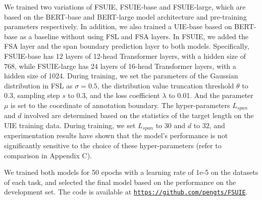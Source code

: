 \documentclass[11pt]{article}
\begin{document}
We trained two variations of FSUIE, FSUIE-base and FSUIE-large, which are based on the BERT-base and BERT-large model architecture and pre-training parameters respectively. In addition, we also trained a UIE-base based on BERT-base as a baseline without using FSL and FSA layers. In FSUIE, we added the FSA layer and the span boundary prediction layer to both models. Specifically, FSUIE-base has 12 layers of 12-head Transformer layers, with a hidden size of 768, while FSUIE-large has 24 layers of 16-head Transformer layers, with a hidden size of 1024. 
During training, we set the parameters of the Gaussian distribution in FSL as $\sigma=0.5$, the distribution value truncation threshold $\theta$ to 0.3, sampling step $s$ to 0.3, and the loss coefficient $\lambda$ to 0.01. And the parameter $\mu$ is set to the coordinate of annotation boundary.
The hyper-parameters $L_{span}$ and $d$ involved are determined based on the statistics of the target length on the UIE training data. During training, we set $L_{span}$ to $30$ and $d$ to $32$, and experimentation results have shown that the model's performance is not significantly sensitive to the choice of these hyper-parameters (refer to comparison in Appendix C).

We trained both models for 50 epochs with a learning rate of 1e-5 on the datasets of each task, and selected the final model based on the performance on the development set.
The code is available at
\href{https://github.com/pengts/FSUIE}{\tt https://github.com/pengts/FSUIE}.
\end{document}
